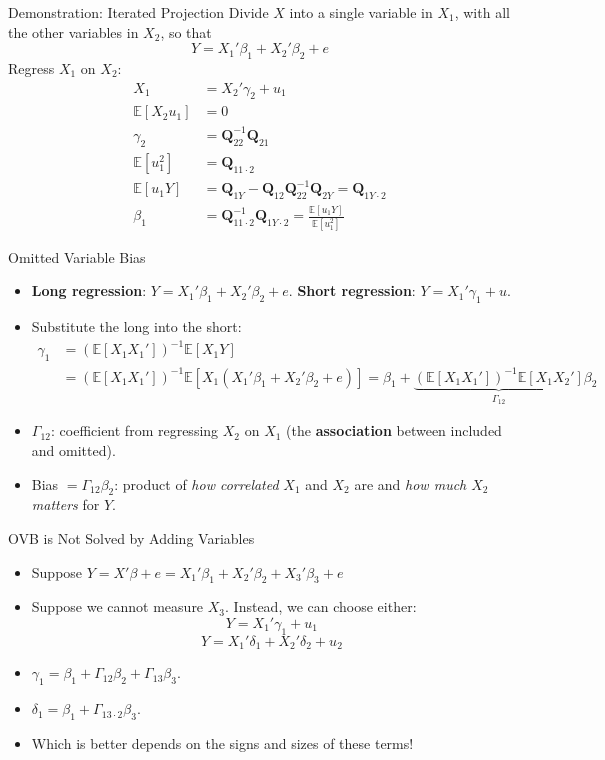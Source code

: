 \documentclass[aspectratio=169, handout, t]{beamer}
\numberwithin{equation}{section}
\begin{document}
\begin{frame}{Demonstration: Iterated Projection}
Divide $X$ into a single variable in $X_1$, with all the other variables in $X_2$, so that
$$Y=X_1'\beta_1+X_2'\beta_2+e$$
Regress $X_1$ on $X_2$:
\begin{align*}
X_1&=X_2'\gamma_2+u_1\\
\mathbb{E}[X_2u_1]&=0\\
\gamma_2&=\mathbf{Q}_{22}^{-1} \mathbf{Q}_{21}\\
\mathbb{E}[u_1^2]&=\mathbf{Q}_{11\cdot 2}\\
\mathbb{E}[u_1Y]&=\mathbf{Q}_{1Y}-\mathbf{Q}_{12}\mathbf{Q}^{-1}_{22}\mathbf{Q}_{2Y}=\mathbf{Q}_{1Y\cdot2}\\
\beta_1&=\mathbf{Q}_{11\cdot 2}^{-1} \mathbf{Q}_{1Y\cdot 2}=\frac{\mathbb{E}[u_1Y]}{\mathbb{E}[u_1^2]}
\end{align*}
\end{frame}

\begin{frame}{Omitted Variable Bias}
\begin{itemize}
\item \textbf{Long regression}: $Y=X_1'\beta_1+X_2'\beta_2+e$. \quad \textbf{Short regression}: $Y=X_1'\gamma_1+u$.
\pause
\item Substitute the long into the short:
\begin{align*}
\gamma_1&=(\mathbb{E}[X_1X_1'])^{-1}\mathbb{E}[X_1Y]\\
&=(\mathbb{E}[X_1X_1'])^{-1}\mathbb{E}[X_1(X_1'\beta_1+X_2'\beta_2+e)]
=\beta_1+\underbrace{(\mathbb{E}[X_1X_1'])^{-1}\mathbb{E}[X_1X_2']}_{\Gamma_{12}}\beta_2
\end{align*}
\pause
\item $\Gamma_{12}$: coefficient from regressing $X_2$ on $X_1$ (the \textbf{association} between included and omitted).
\item \alert{Bias} $= \Gamma_{12}\beta_2$: product of \emph{how correlated} $X_1$ and $X_2$ are and \emph{how much $X_2$ matters} for $Y$.
\end{itemize}
\end{frame}


\begin{frame}{OVB is Not Solved by Adding Variables}
\begin{itemize}
\item Suppose $Y=X'\beta+e=X_1'\beta_1+X_2'\beta_2+X_3'\beta_3+e$
\item Suppose we cannot measure $X_3$.  Instead, we can choose either:
$$Y=X_1'\gamma_1+u_1$$
$$Y=X_1'\delta_1+X_2'\delta_2+u_2$$
\item $\gamma_1=\beta_1+\Gamma_{12}\beta_2+\Gamma_{13}\beta_3$.
\item $\delta_1=\beta_1+\Gamma_{13\cdot 2}\beta_3$.
\item Which is better depends on the signs and sizes of these terms!
\end{itemize}
\end{frame}
\end{document}
